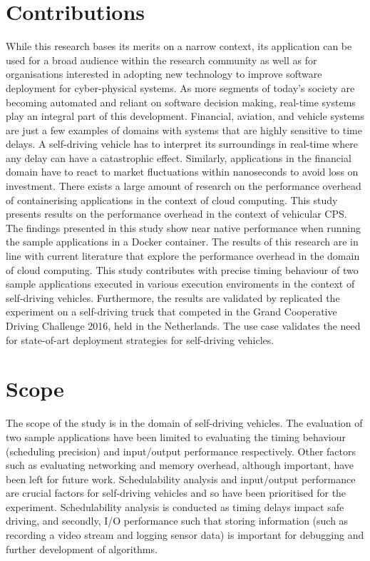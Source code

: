\section{Contributions}

While this research bases its merits on a narrow context, its application can be used for a broad audience within the research community as well as for organisations interested in adopting new technology to improve software deployment for cyber-physical systems. As more segments of today’s society are becoming automated and reliant on software decision making, real-time systems play an integral part of this development. Financial, aviation, and vehicle systems are just a few examples of domains with systems that are highly sensitive to time delays. A self-driving vehicle has to interpret its surroundings in real-time where any delay can have a catastrophic effect. Similarly, applications in the financial domain have to react to market fluctuations within nanoseconds to avoid loss on investment. There exists a large amount of research on the performance overhead of containerising applications in the context of cloud computing. This study presents results on the performance overhead in the context of vehicular CPS. \\

The findings presented in this study show near native performance when running the sample applications in a Docker container. The results of this research are in line with current literature that explore the performance overhead in the domain of cloud computing. This study contributes with precise timing behaviour of two sample applications executed in various execution enviroments in the context of self-driving vehicles. Furthermore, the results are validated by replicated the experiment on a self-driving truck that competed in the Grand Cooperative Driving Challenge 2016, held in the Netherlands. The use case validates the need for state-of-art deployment strategies for self-driving vehicles. 
\section{Scope}
The scope of the study is in the domain of self-driving vehicles. The evaluation of two sample applications have been limited to evaluating the timing behaviour (scheduling precision) and input/output performance respectively. Other factors such as evaluating networking and memory overhead, although important, have been left for future work. Schedulability analysis and input/output performance are crucial factors for self-driving vehicles and so have been prioritised for the experiment. Schedulability analysis is conducted as timing delays impact safe driving, and secondly, I/O performance such that storing information (such as recording a video stream and logging sensor data) is important for debugging and further development of algorithms. 


